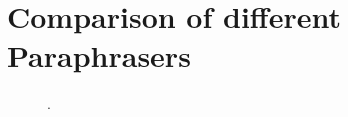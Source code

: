 \section{Comparison of different Paraphrasers}

\begin{figure}[htbp]
    \centering
    
    \caption{.}
    \label{fig:extraction_eval}
\end{figure}